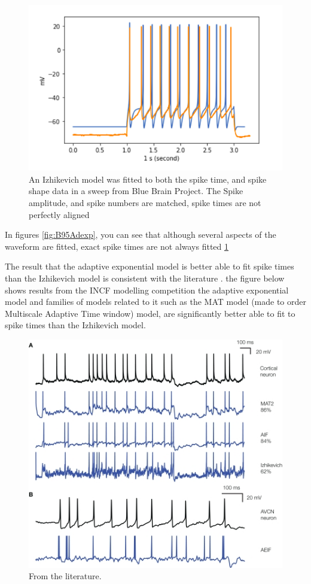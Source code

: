 \begin{figure}
    \centering
    \includegraphics{figures/IZHI_B95.png}
    \caption{An Izhikevich model was fitted to both the spike time, and spike shape data in a sweep from Blue Brain Project. The Spike amplitude, and spike numbers are matched, spike times are not perfectly aligned}
    \label{fig:B95_IZHI}
\end{figure}

In figures \ref{fig:B95Adexp}, you can see that although several aspects of the waveform are fitted, exact spike times are not always fitted \ref{fig:B95_IZHI}

The result that the adaptive exponential model is better able to fit spike times than the Izhikevich model is consistent with the literature \cite{rossant2011fitting}. the figure below shows results from the INCF modelling competition the adaptive exponential model and families of models related to it such as the MAT model (made to order Multiscale Adaptive Time window) model, are significantly better able to fit to spike times than the Izhikevich model.



\begin{figure}
    \centering
    \includegraphics[scale=3.0]{figures/IZHIkevich_fit_60Adexp_80.jpg}
    \caption{
    From the literature.
    \cite{rossant2011fitting}
    }
    \label{fig:my_label}
\end{figure}